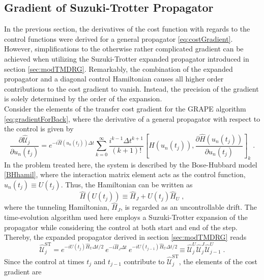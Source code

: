 \subsection{Gradient of Suzuki-Trotter Propagator} \label{sec:TrotterGrad}
In the previous section, the derivatives of the cost function with regards to the control functions were derived for a general propagator \eqref{eq:costGradient}. However, simplifications to the otherwise rather complicated gradient can be achieved when utilizing the Suzuki-Trotter expanded propagator introduced in section \ref{sec:modTMDRG}.
Remarkably, the combination of the expanded propagator and a diagonal control Hamiltonian causes all higher order contributions to the cost gradient to vanish. Instead, the precision of the gradient is solely determined by the order of the expansion.\\
Consider the elements of the transfer cost gradient for the GRAPE algorithm \eqref{eq:gradientForBack}, where the derivative of a general propagator with respect to the control is given by
\begin{equation}
	\frac{\partial \hat{\mathcal{U}}_{j}}{\partial u_n (t_j)} = e^{-i \hat{H} (u_n (t_j)) \Delta t}  \sum_{k = 0}^{\infty }  \frac{i^{k-1} \Delta t^{k+1}}{(k+1)!} \left[ \hat{H} (u_n (t_j)) , \frac{\partial \hat{H} (u_n (t_j))}{\partial u_n (t_j)}  \right]_k \;.
\end{equation}
In the problem treated here, the system is described by the Bose-Hubbard model \eqref{BHhamil}, where the interaction matrix element acts as the control function, $u_n (t_j) \equiv U (t_j)$. Thus, the Hamiltonian can be written as 
\begin{equation}
	\hat{H}(U(t_j)) \equiv \hat{H}_J + U(t_j) \hat{H}_U \; ,
\end{equation}
where the tunneling Hamiltonian, $\hat{H}_J$, is regarded as an uncontrollable drift. The time-evolution algorithm used here employs a Suzuki-Trotter expansion of the propagator while considering the control at both start and end of the step. Thereby, the expanded propagator derived in section \ref{sec:modTMDRG} reads
\begin{equation}
	\hat{\mathcal{U}}_{j}^{\mathrm{ST}} = e^{ -i U(t_j) \hat{H}_U \Delta t /2 } \: e^{ -i \hat{H}_J \Delta t } \: e^{  -i  U(t_{j-1}) \hat{H}_U  \Delta t /2 }  \equiv \hat{\mathcal{U}}_{j}^{U} \hat{\mathcal{U}}_{j}^{J} \hat{\mathcal{U}}_{j-1}^{U} \; .
\end{equation}
Since the control at times $t_j$ and $t_{j-1}$ contribute to $\hat{\mathcal{U}}_{j}^{\mathrm{ST}}$, the elements of the cost gradient are
